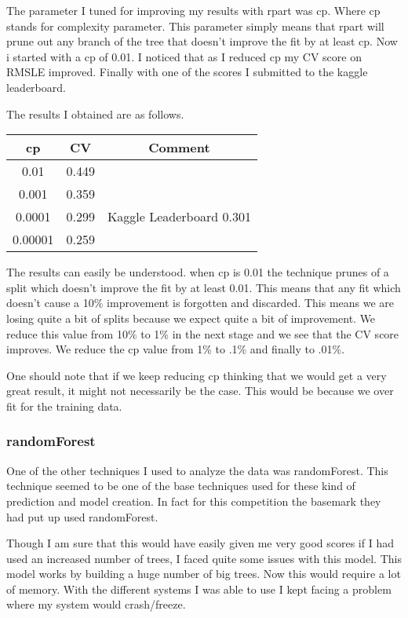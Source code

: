 \documentclass[paper=a4, fontsize=11pt]{scrartcl}	%
\numberwithin{equation}{section}		%
\numberwithin{figure}{section}			%
\numberwithin{table}{section}				%
\begin{document}
The parameter I tuned for improving my results with rpart was cp. Where cp stands for complexity parameter. This parameter simply means that rpart will prune out any branch of the tree that doesn’t improve the fit by at least cp. Now i started with a cp of 0.01. I noticed that as I reduced cp my CV score on RMSLE improved. Finally with one of the scores I submitted to the kaggle leaderboard.

The results I obtained are as follows.

\begin{center} \begin{tabular}[h]{|c|c|c|}
\hline
cp & CV & Comment \\ \hline
0.01 & 0.449 & \\
0.001 & 0.359 & \\
0.0001 & 0.299 & Kaggle Leaderboard 0.301 \\
0.00001 & 0.259 & \\ \hline
\end{tabular} \end{center}

The results can easily be understood. when cp is 0.01 the technique prunes of a split which doesn’t improve the fit by at least 0.01. This means that any fit which doesn’t cause a 10\% improvement is forgotten and discarded. This means we are losing quite a bit of splits because we expect quite a bit of improvement. We reduce this value from 10\% to 1\% in the next stage and we see that the CV score improves. We reduce the cp value from 1\% to .1\% and finally to .01\%.

One should note that if we keep reducing cp thinking that we would get a very great result, it might not necessarily be the case. This would be because we over fit for the training data.

\subsubsection{randomForest}

One of the other techniques I used to analyze the data was randomForest. This technique seemed to be one of the base techniques used for these kind of prediction and model creation. In fact for this competition the basemark they had put up used randomForest. 

Though I am sure that this would have easily given me very good scores if I had used an increased number of trees, I faced quite some issues with this model. This model works by building a huge number of big trees. Now this would require a lot of memory. With the different systems I was able to use I kept facing a problem where my system would crash/freeze.
\end{document}
